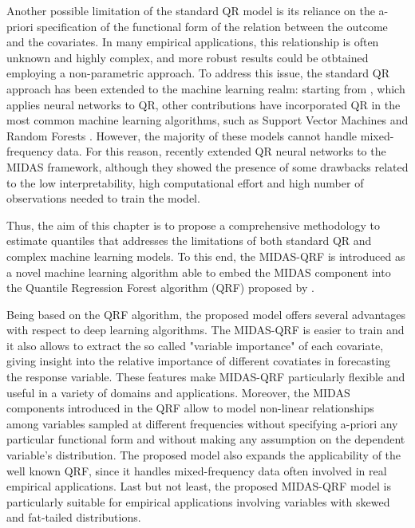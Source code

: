 \noindent Another possible limitation of the standard QR model is its reliance on the a-priori specification of the functional form of the relation between the outcome and the covariates. In many empirical applications, this relationship is often unknown and highly complex, and more robust results could be otbtained employing a non-parametric approach.
To address this issue, the standard QR approach has been extended to the machine learning realm: starting from \cite{white1992nonparametric}, which applies neural networks to QR, other contributions have incorporated QR in the most common machine learning algorithms, such as Support Vector Machines \citep{hwang2005simple, xu2015weighted} and Random Forests \citep{meinshausen2006quantile, athey2019generalized}. However, the majority of these models cannot handle mixed-frequency data. For this reason, recently \cite{xu2019artificial, xu2021qrnn} extended QR neural networks to the MIDAS framework, although they showed the presence of some drawbacks related to the low interpretability, high computational effort and high number of observations needed to train the model.\vspace{0.15in}

\noindent Thus, the aim of this chapter is to propose a comprehensive methodology to estimate quantiles that addresses the limitations of both standard QR and complex machine learning models. To this end, the MIDAS-QRF is introduced as a novel machine learning algorithm able to embed the MIDAS component into the Quantile Regression Forest algorithm (QRF) proposed by \cite{meinshausen2006quantile}. 
\vspace{0.15in}

\noindent Being based on the QRF algorithm, the proposed model offers several advantages with respect to deep learning algorithms. The MIDAS-QRF is easier to train and it also allows to extract the so called "variable importance" of each covariate,  giving insight into the relative importance of different covatiates in forecasting the response variable. These features make MIDAS-QRF particularly flexible and useful in a variety of domains and applications.
Moreover, the MIDAS components introduced in the QRF allow to model non-linear relationships among variables sampled at different frequencies without specifying a-priori any particular functional form and without making any assumption on the dependent variable's distribution. The proposed model also expands the applicability of the well known QRF, since it handles mixed-frequency data often involved in real empirical applications. Last but not least,
the proposed MIDAS-QRF model is particularly suitable for empirical applications involving variables with skewed and fat-tailed distributions.

